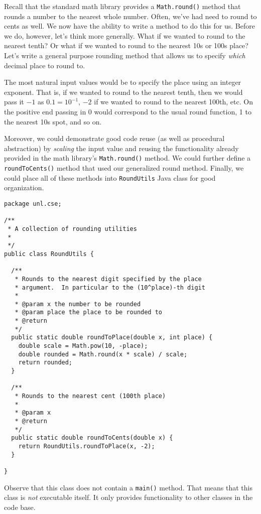 Recall that the standard math library provides a 
\texttt{Math.round()} method that rounds a number to 
the nearest whole number.  Often, we've had need to round to 
cents as well.  We now have the ability to write a method to do 
this for us.  Before we do, however, let's think more generally.  
What if we wanted to round to the nearest tenth?  Or
what if we wanted to round to the nearest 10s or 100s place?  Let's
write a general purpose rounding method that allows us to specify
\emph{which} decimal place to round to.  

The most natural input values would be to specify the place using
an integer exponent.  That is, if we wanted to round to the nearest
tenth, then we would pass it $-1$ as $0.1 = 10^{-1}$, $-2$ if we wanted
to round to the nearest 100th, etc.  On the positive end passing in 0
would correspond to the usual round function, 1 to the nearest 10s spot, 
and so on.  

Moreover, we could demonstrate good code reuse (as well as procedural
abstraction) by \emph{scaling} the input value and reusing the functionality
already provided in the math library's \texttt{Math.round()} 
method.  We could further define a \texttt{roundToCents()} 
method that used our generalized round method.  Finally, we could place
all of these methods into \texttt{RoundUtils} Java class for
good organization.

\begin{verbatim}
package unl.cse;

/**
 * A collection of rounding utilities
 *
 */
public class RoundUtils {
  
  /**
   * Rounds to the nearest digit specified by the place
   * argument.  In particular to the (10^place)-th digit
   *
   * @param x the number to be rounded
   * @param place the place to be rounded to
   * @return
   */
  public static double roundToPlace(double x, int place) {
    double scale = Math.pow(10, -place);
    double rounded = Math.round(x * scale) / scale;
    return rounded;
  }

  /**
   * Rounds to the nearest cent (100th place)
   * 
   * @param x
   * @return
   */
  public static double roundToCents(double x) {
    return RoundUtils.roundToPlace(x, -2);
  }

}
\end{verbatim}

Observe that this class does not contain a \texttt{main()}
method.  That means that this class is \emph{not} executable 
itself.  It only provides functionality to other classes in the code
base.  







